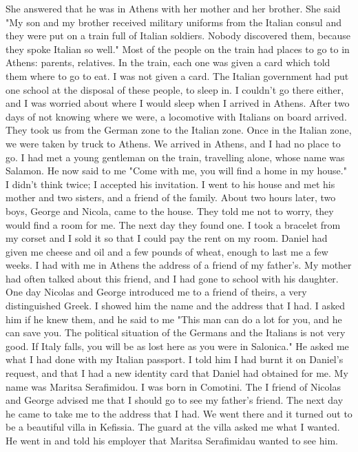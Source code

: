 She answered that he was in Athens with 
her mother and her brother.
She said "My son and my brother received 
military uniforms from the Italian consul and they were put on a train 
full of Italian soldiers.
Nobody discovered them, because they spoke 
Italian so well."
Most of the people on the train had places to go to in Athens: parents, relatives.
In the train, each one was given a card which told them where to go to eat.
I was not given a card.
The Italian government had put one school at the disposal of these people, to sleep in.
I couldn't go there either, and I was worried about where I would sleep when I arrived in Athens.
After two days of not knowing where we were, a locomotive with Italians on board arrived.
They took us from the German zone to the Italian zone.
Once in the Italian zone, we were taken 
by truck to Athens.
We arrived in Athens, and I had no place to go.
I had met a young gentleman on the train, travelling alone, whose name was Salamon.
He now said to me "Come with me, you will find a home in my house."
I didn't think twice; I accepted his invitation.
I went to his house and 
met his mother and two sisters, and a friend of the family.
About two 
hours later, two boys, George and Nicola, came to the house.
They told 
me not to worry, they would find a room for me.
The next day they found 
one.
I took a bracelet from my corset and I sold it so that I could pay 
the rent on my room.
Daniel had given me cheese and oil and a few pounds
of wheat, enough to last me a few weeks.
I had with me in Athens the address of a friend of my father's.
My mother had often talked about this friend, and I had gone to school
with his daughter.
One day Nicolas and George introduced me to a friend 
of theirs, a very distinguished Greek.
I showed him the name and the 
address that I had.
I asked him if he knew them, and he said to me 
"This man can do a lot for you, and he can save you.
The political situation of the Germans and the Italians is not very good.
If Italy falls, you will be as lost here as you were in Salonica."
He asked me what I had done with my Italian passport.
I told him I had burnt it on Daniel's 
request, and that I had a new identity card that Daniel had obtained for 
me.
My name was Maritsa Serafimidou.
I was born in Comotini.
The I friend of Nicolas and George advised me that I should go to see my father's 
friend.
The next day he came to take me to the address that I had.
We went 
there and it turned out to be a beautiful villa in Kefissia.
The guard 
at the villa asked me what I wanted.
He went in and told his employer 
that Maritsa Serafimidau wanted to see him.
